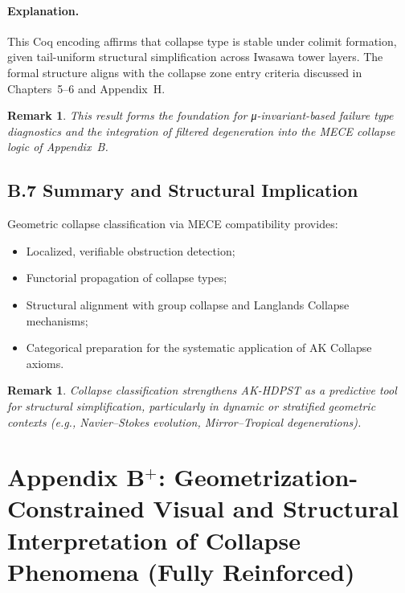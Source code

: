 \documentclass[11pt]{article}
\newtheorem{remark}[theorem]{Remark}
\begin{document}
\paragraph{Explanation.}
This Coq encoding affirms that collapse type is stable under colimit formation, given tail-uniform structural simplification across Iwasawa tower layers. The formal structure aligns with the collapse zone entry criteria discussed in Chapters~5–6 and Appendix~H.

\begin{remark}
This result forms the foundation for μ-invariant-based failure type diagnostics and the integration of filtered degeneration into the MECE collapse logic of Appendix~B.
\end{remark}



\subsection*{B.7 Summary and Structural Implication}

Geometric collapse classification via MECE compatibility provides:

\begin{itemize}
    \item Localized, verifiable obstruction detection;
    \item Functorial propagation of collapse types;
    \item Structural alignment with group collapse and Langlands Collapse mechanisms;
    \item Categorical preparation for the systematic application of AK Collapse axioms.
\end{itemize}

\begin{remark}
Collapse classification strengthens AK-HDPST as a predictive tool for structural simplification, particularly in dynamic or stratified geometric contexts (e.g., Navier–Stokes evolution, Mirror–Tropical degenerations).
\end{remark}




\section*{Appendix B$^{+}$: Geometrization-Constrained Visual and Structural Interpretation of Collapse Phenomena (Fully Reinforced)}
\end{document}
